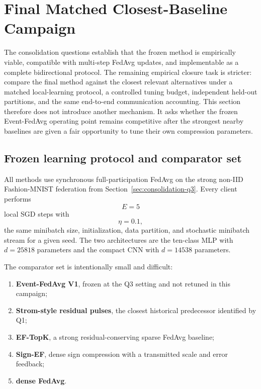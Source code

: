 \section{Final Matched Closest-Baseline Campaign}
\label{sec:final-baseline-campaign}

The consolidation questions establish that the frozen method is empirically viable, compatible with multi-step FedAvg updates, and implementable as a complete bidirectional protocol. The remaining empirical closure task is stricter: compare the final method against the closest relevant alternatives under a matched local-learning protocol, a controlled tuning budget, independent held-out partitions, and the same end-to-end communication accounting. This section therefore does not introduce another mechanism. It asks whether the frozen Event-FedAvg operating point remains competitive after the strongest nearby baselines are given a fair opportunity to tune their own compression parameters.

\subsection{Frozen learning protocol and comparator set}

All methods use synchronous full-participation FedAvg on the strong non-IID Fashion-MNIST federation from Section~\ref{sec:consolidation-q3}. Every client performs
\begin{equation}
    E=5
\end{equation}
local SGD steps with
\begin{equation}
    \eta=0.1,
\end{equation}
the same minibatch size, initialization, data partition, and stochastic minibatch stream for a given seed. The two architectures are the ten-class MLP with $d=25818$ parameters and the compact CNN with $d=14538$ parameters.

The comparator set is intentionally small and difficult:
\begin{enumerate}
    \item \textbf{Event-FedAvg V1}, frozen at the Q3 setting and not retuned in this campaign;
    \item \textbf{Strom-style residual pulses}, the closest historical predecessor identified by Q1;
    \item \textbf{EF-TopK}, a strong residual-conserving sparse FedAvg baseline;
    \item \textbf{Sign-EF}, dense sign compression with a transmitted scale and error feedback;
    \item \textbf{dense FedAvg}.
\end{enumerate}

